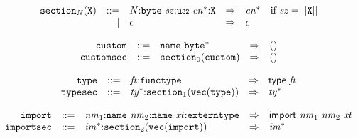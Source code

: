 \vspace{1ex}

\vspace{1ex}

$$
\begin{array}{@{}l@{}rrlll@{}l@{}}
& {{\mathtt{section}}}_{{\mathit{N}}}({\mathtt{X}}) &::=& {\mathit{N}}{:}{\mathtt{byte}}~{\mathit{sz}}{:}{\mathtt{u{\scriptstyle32}}}~{{\mathit{en}}^\ast}{:}{\mathtt{X}} &\Rightarrow& {{\mathit{en}}^\ast} &\quad
  \mbox{if}~{\mathit{sz}} = ||{\mathtt{X}}|| \\ &&|&
\epsilon &\Rightarrow& \epsilon \\
\end{array}
$$

\vspace{1ex}

$$
\begin{array}{@{}l@{}rrlll@{}l@{}}
& {\mathtt{custom}} &::=& {\mathtt{name}}~{{\mathtt{byte}}^\ast} &\Rightarrow& () \\
& {\mathtt{customsec}} &::=& {{\mathtt{section}}}_{0}({\mathtt{custom}}) &\Rightarrow& () \\
\end{array}
$$

\vspace{1ex}

$$
\begin{array}{@{}l@{}rrlll@{}l@{}}
& {\mathtt{type}} &::=& {\mathit{ft}}{:}{\mathtt{functype}} &\Rightarrow& \mathsf{type}~{\mathit{ft}} \\
& {\mathtt{typesec}} &::=& {{\mathit{ty}}^\ast}{:}{{\mathtt{section}}}_{1}({\mathtt{vec}}({\mathtt{type}})) &\Rightarrow& {{\mathit{ty}}^\ast} \\
\end{array}
$$

\vspace{1ex}

$$
\begin{array}{@{}l@{}rrlll@{}l@{}}
& {\mathtt{import}} &::=& {\mathit{nm}}_{{1}}{:}{\mathtt{name}}~{\mathit{nm}}_{{2}}{:}{\mathtt{name}}~{\mathit{xt}}{:}{\mathtt{externtype}} &\Rightarrow& \mathsf{import}~{\mathit{nm}}_{{1}}~{\mathit{nm}}_{{2}}~{\mathit{xt}} \\
& {\mathtt{importsec}} &::=& {{\mathit{im}}^\ast}{:}{{\mathtt{section}}}_{2}({\mathtt{vec}}({\mathtt{import}})) &\Rightarrow& {{\mathit{im}}^\ast} \\
\end{array}
$$

\vspace{1ex}

